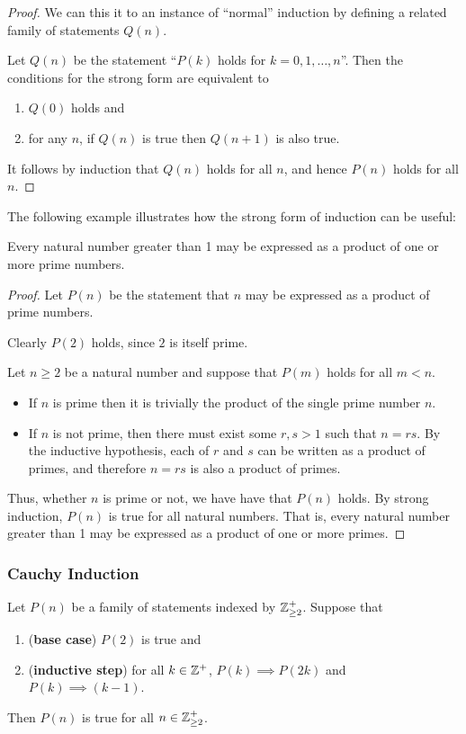 \begin{proof}
We can this it to an instance of ``normal'' induction by defining a related family of statements $Q(n)$. 

Let $Q(n)$ be the statement ``$P(k)$ holds for $k=0,1,\dots,n$''. Then the conditions for the strong form are equivalent to 
\begin{enumerate}[label=(\roman*)]
\item $Q(0)$ holds and 
\item for any $n$, if $Q(n)$ is true then $Q(n+1)$ is also true.
\end{enumerate}
It follows by induction that $Q(n)$ holds for all $n$, and hence $P(n)$ holds for all $n$.
\end{proof}

The following example illustrates how the strong form of induction can be useful:

\begin{example}
Every natural number greater than 1 may be expressed as a product of one or more prime numbers.
\end{example}

\begin{proof}
Let $P(n)$ be the statement that $n$ may be expressed as a product of prime numbers. 

Clearly $P(2)$ holds, since $2$ is itself prime. 

Let $n \ge 2$ be a natural number and suppose that $P(m)$ holds for all $m<n$.

\begin{itemize}
\item If $n$ is prime then it is trivially the product of the single prime number $n$. 

\item If $n$ is not prime, then there must exist some $r, s > 1$ such that $n = rs$. By the inductive hypothesis, each of $r$ and $s$ can be written as a product of primes, and therefore $n = rs$ is also a product of primes.
\end{itemize}

Thus, whether $n$ is prime or not, we have have that $P(n)$ holds. By strong induction, $P(n)$ is true for all natural numbers. That is, every natural number greater than 1 may be expressed as a product of one or more primes.
\end{proof}

\subsubsection{Cauchy Induction}
\begin{theorem}
Let $P(n)$ be a family of statements indexed by $\mathbb Z^+_{\ge2}$. Suppose that
\begin{enumerate}[label=(\roman*)]
\item (\textbf{base case}) $P(2)$ is true and
\item (\textbf{inductive step}) for all $k\in\mathbb Z^+$, $P(k)\implies P(2k)$ and $P(k)\implies (k-1)$.
\end{enumerate}
Then $P(n)$ is true for all $n\in\mathbb Z^+_{\ge2}$.
\end{theorem}

